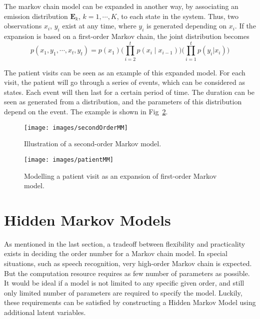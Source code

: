 The markov chain model can be expanded in another way, by associating an emission distribution \(\mathbf{E}_k\), \(k = 1, \cdots , K\), to each state in the system. Thus, two observations \(x_i\), \(y_i\) exist at any time, where \(y_i\) is generated depending on \(x_i\). If the expansion is based on a first-order Markov chain, the joint distribution becomes
\begin{equation}
	p(x_1, y_1, \cdots, x_t, y_t) = p(x_1)\big(\prod_{i = 2}^{t} p(x_i \mid x_{i-1})\big)\big(\prod_{i=1}^{t}p(y_i|x_i)\big)
\end{equation}

The patient visits can be seen as an example of this expanded model. For each visit, the patient will go through a series of events, which can be considered as states. Each event will then last for a certain period of time. The duration can be seen as generated from a distribution, and the parameters of this distribution depend on the event. The example is shown in Fig~\ref{fig:patientMM}.

\begin{figure}[!ht]
	\begin{center}
		\texttt{[image: images/secondOrderMM]}
		\caption{Illustration of a second-order Markov model.}
		\label{fig:secondOrderMM}
	\end{center}
\end{figure}

\begin{figure}[!ht]
	\begin{center}
		\texttt{[image: images/patientMM]}
		\caption{Modelling a patient visit as an expansion of first-order Markov model.}
		\label{fig:patientMM}
	\end{center}
\end{figure}


\section{Hidden Markov Models}
\label{sec:HMM}
As mentioned in the last section, a tradeoff between flexibility and practicality exists in deciding the order number for a Markov chain model. In special situations, such as speech recognition, very high-order Markov chain is expected. But the computation resource requires as few number of parameters as possible. It would be ideal if a model is not limited to any specific given order, and still only limited number of parameters are required to specify the model. Luckily, these requirements can be satisfied by constructing a Hidden Markov Model using additional latent variables. 

